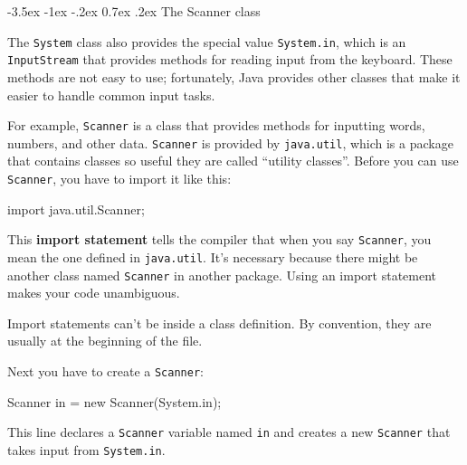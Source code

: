 \documentclass[12pt]{book}
\makeatletter
\theoremstyle{exercise}
\newcommand{\java}[1]{\verb"#1"}
\renewcommand{\section}{\@startsection{section}{1}{\z@}%
    {-3.5ex \@plus -1ex \@minus -.2ex}%
    {0.7ex \@plus.2ex}%
    {\normalfont\Large\bfseries}}
\newcommand{\java}[1]{\lstinline{#1}} %
\makeatother
\begin{document}
\section{The Scanner class}
\label{scanner}

%

The \java{System} class also provides the special value \java{System.in}, which is an \java{InputStream} that provides methods for reading input from the keyboard.
These methods are not easy to use; fortunately, Java provides other classes that make it easier to handle common input tasks.


For example, \java{Scanner} is a class that provides methods for inputting words, numbers, and other data.
\java{Scanner} is provided by \java{java.util}, which is a package that contains classes so useful they are called ``utility classes''.
Before you can use \java{Scanner}, you have to import it like this:

\begin{code}
import java.util.Scanner;
\end{code}


This {\bf import statement} tells the compiler that when you say \java{Scanner}, you mean the one defined in \java{java.util}.
It's necessary because there might be another class named \java{Scanner} in another package.
Using an import statement makes your code unambiguous.

Import statements can't be inside a class definition.
By convention, they are usually at the beginning of the file.

Next you have to create a \java{Scanner}:

\begin{code}
    Scanner in = new Scanner(System.in);
\end{code}

This line declares a \java{Scanner} variable named \java{in} and creates a new \java{Scanner} that takes input from \java{System.in}.
\end{document}
